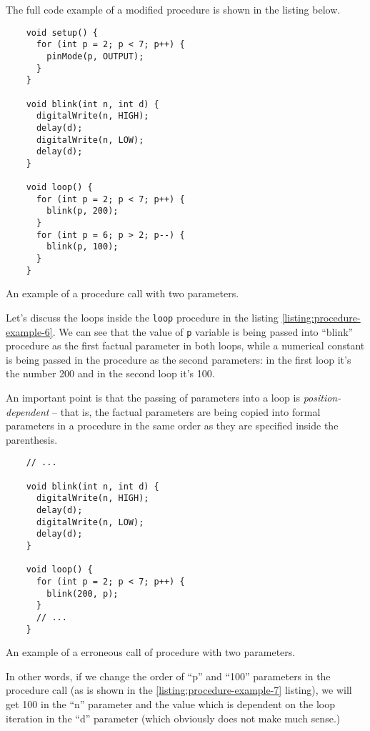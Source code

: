 \documentclass[../sparc.tex]{subfiles}
\begin{document}
The full code example of a modified procedure is shown in the listing below.

\begin{listing}[H]
  \begin{verbatim}
    void setup() {
      for (int p = 2; p < 7; p++) {
        pinMode(p, OUTPUT);
      }
    }

    void blink(int n, int d) {
      digitalWrite(n, HIGH);
      delay(d);
      digitalWrite(n, LOW);
      delay(d);
    }

    void loop() {
      for (int p = 2; p < 7; p++) {
        blink(p, 200);
      }
      for (int p = 6; p > 2; p--) {
        blink(p, 100);
      }
    }
  \end{verbatim}
  \label{listing:procedure-example-6}
  \caption{An example of a procedure call with two parameters.}
\end{listing}

Let's discuss the loops inside the \texttt{loop} procedure in the
listing \ref{listing:procedure-example-6}.  We can see that the value of
\texttt{p} variable is being passed into ``blink'' procedure as the
first factual parameter in both loops, while a numerical constant is being
passed in the procedure as the second parameters: in the first loop it's the
number 200 and in the second loop it's 100.

An important point is that the passing of parameters into a loop is
\emph{position-dependent} -- that is, the factual parameters are being copied
into formal parameters in a procedure in the same order as they are specified
inside the parenthesis.

\begin{listing}[H]
  \begin{verbatim}
    // ...

    void blink(int n, int d) {
      digitalWrite(n, HIGH);
      delay(d);
      digitalWrite(n, LOW);
      delay(d);
    }

    void loop() {
      for (int p = 2; p < 7; p++) {
        blink(200, p);
      }
      // ...
    }
  \end{verbatim}
  \label{listing:procedure-example-7}
  \caption{An example of a erroneous call of procedure with two parameters.}
\end{listing}

In other words, if we change the order of ``p'' and ``100'' parameters in the
procedure call (as is shown in the \ref{listing:procedure-example-7} listing),
we will get 100 in the ``n'' parameter and the value which is dependent on the
loop iteration in the ``d'' parameter (which obviously does not make much
sense.)
\end{document}
